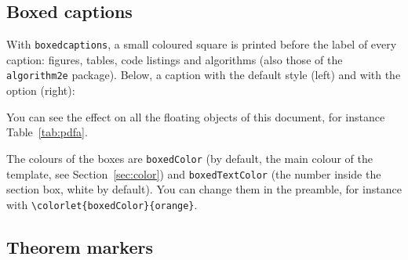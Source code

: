 \begin{center}
\end{center}

\subsection{Boxed captions}

With \texttt{boxedcaptions}, a small coloured square is printed before the label of every caption: figures, tables, code listings and algorithms (also those of the \texttt{algorithm2e} package).
Below, a caption with the default style (left) and with the option (right):

\begin{center}
\end{center}
You can see the effect on all the floating objects of this document, for instance Table~\ref{tab:pdfa}.

The colours of the boxes are \texttt{boxedColor} (by default, the main colour of the template, see Section~\ref{sec:color}) and \texttt{boxedTextColor} (the number inside the section box, white by default).
You can change them in the preamble, for instance with \verb|\colorlet{boxedColor}{orange}|.

\subsection{Theorem markers}


